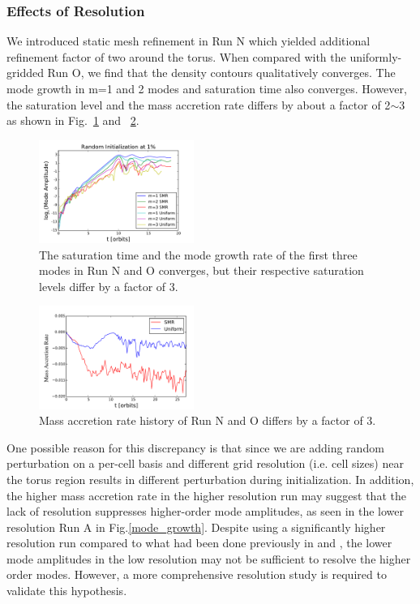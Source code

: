 \documentclass[iop,revtex4]{emulateapj}
\begin{document}
 \subsubsection{Effects of Resolution}
\par We introduced static mesh refinement in Run N which yielded additional refinement factor of two around the torus. When compared with the uniformly-gridded Run O, we find that the density contours qualitatively converges. The mode growth in m=1 and 2 modes and saturation time also converges. However, the saturation level and the mass accretion rate differs by about a factor of 2$\sim$3 as shown in Fig.~\ref{sat_level_comp} and ~\ref{mass_acc_comp}. 
\begin{figure}[ht]
\includegraphics[width=0.45\textwidth,bb=0 0 30 30]{plots/randinit1percent_smr.pdf}
\caption{The saturation time and the mode growth rate of the first three modes in Run N and O converges, but their respective saturation levels differ by a factor of 3.}
\label{sat_level_comp}
\end{figure}
\begin{figure}[ht]
\includegraphics[width=0.45\textwidth,trim = 0 0 0 10,bb=0 0 30 30 ]{plots/mass_accretion_smr.pdf}
\caption{Mass accretion rate history of Run N and O differs by a factor of 3.}
\label{mass_acc_comp}
\end{figure}
\par One possible reason for this discrepancy is that since we are adding random perturbation on a per-cell basis and different grid resolution (i.e. cell sizes) near the torus region results in different perturbation during initialization. In addition, the higher mass accretion rate in the higher resolution run may suggest that the lack of resolution suppresses higher-order mode amplitudes, as seen in the lower resolution Run A in Fig.\ref{mode_growth}. Despite using a significantly higher resolution run compared to what had been done previously in \cite{Hawley:1990A} and \cite{Hawley:1991A}, the lower mode amplitudes in the low resolution  may not be sufficient to resolve the higher order modes. However, a more comprehensive resolution study is required to validate this hypothesis.
\end{document}
